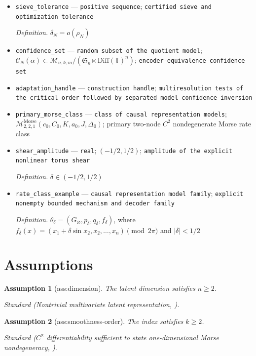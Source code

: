 \documentclass{article}
\newtheorem{assumption}{Assumption}
\begin{document}
\begin{itemize}
  \item \texttt{sieve\_\allowbreak{}tolerance} --- \texttt{positive sequence}; \texttt{certified sieve and optimization tolerance}
  \par\smallskip\noindent\emph{Definition.} \(\delta_N=o(\rho_N)\)
  \item \texttt{confidence\_\allowbreak{}set} --- \texttt{random subset of the quotient model}; \(\mathcal C_N(\alpha)\subset\mathcal M_{n,k,m}/(\mathfrak S_n\ltimes\mathrm{Diff}(\mathbb T)^n)\); \texttt{encoder-\allowbreak{}equivalence confidence set}
  \item \texttt{adaptation\_\allowbreak{}handle} --- \texttt{construction handle}; \texttt{multiresolution tests of the critical order followed by separated-\allowbreak{}model confidence inversion}
  \item \texttt{primary\_\allowbreak{}morse\_\allowbreak{}class} --- \texttt{class of causal representation models}; \(\mathcal M^{\mathrm{Morse}}_{2,2,1}(c_0,C_0,K,a_0,J,\Delta_0)\); primary two-node \(C^2\) nondegenerate Morse rate class
  \item \texttt{shear\_\allowbreak{}amplitude} --- \texttt{real}; \((-1/2,1/2)\); \texttt{amplitude of the explicit nonlinear torus shear}
  \par\smallskip\noindent\emph{Definition.} \(\delta\in(-1/2,1/2)\)
  \item \texttt{rate\_\allowbreak{}class\_\allowbreak{}example} --- \texttt{causal representation model family}; \texttt{explicit nonempty bounded mechanism and decoder family}
  \par\smallskip\noindent\emph{Definition.} \(\theta_\delta=(G_\varnothing,p_\delta,q_\delta,f_\delta)\), where \(f_\delta(x)=(x_1+\delta\sin x_2,x_2,\ldots,x_n)\pmod{2\pi}\) and \(|\delta|<1/2\)
\end{itemize}

\section{Assumptions}

\begin{assumption}[ass:dimension]\label{ass:dimension}
The latent dimension satisfies \(n\ge 2\).
\par\smallskip\noindent\emph{Standard} (Nontrivial multivariate latent representation, \cite{LiangEtAl2023CauCA}).
\end{assumption}

\begin{assumption}[ass:smoothness-order]\label{ass:smoothness-order}
The index satisfies \(k\ge2\).
\par\smallskip\noindent\emph{Standard} (\(C^2\) differentiability sufficient to state one-dimensional Morse nondegeneracy, \cite{Milnor1963MorseTheory}).
\end{assumption}
\end{document}
